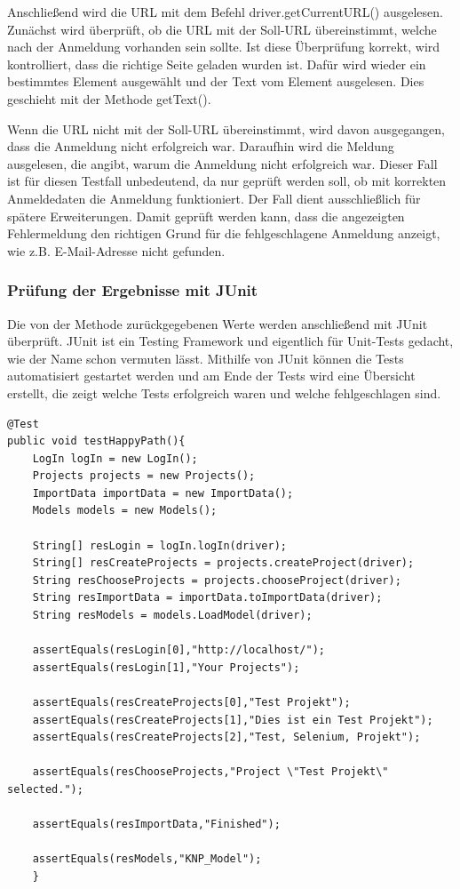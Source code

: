 \documentclass{llncs}
\begin{document}
Anschließend wird die URL mit dem Befehl driver.getCurrentURL() ausgelesen. Zunächst wird überprüft, ob die URL mit der Soll-URL übereinstimmt, welche nach der Anmeldung vorhanden sein sollte. Ist diese Überprüfung korrekt, wird kontrolliert, dass die richtige Seite geladen wurden ist. Dafür wird wieder ein bestimmtes Element ausgewählt und der Text vom Element ausgelesen. Dies geschieht mit der Methode getText(). 

Wenn die URL nicht mit der Soll-URL übereinstimmt, wird davon ausgegangen, dass die Anmeldung nicht erfolgreich war. Daraufhin wird die Meldung ausgelesen, die angibt, warum die Anmeldung nicht erfolgreich war. Dieser Fall ist für diesen Testfall unbedeutend, da nur geprüft werden soll, ob mit korrekten Anmeldedaten die Anmeldung funktioniert. Der Fall dient ausschließlich für spätere Erweiterungen. Damit geprüft werden kann, dass die angezeigten Fehlermeldung den richtigen Grund für die fehlgeschlagene Anmeldung anzeigt, wie z.B. E-Mail-Adresse nicht gefunden.

\subsubsection{Prüfung der Ergebnisse mit JUnit}
Die von der Methode zurückgegebenen Werte werden anschließend mit JUnit überprüft. JUnit ist ein Testing Framework und eigentlich für Unit-Tests gedacht, wie der Name schon vermuten lässt. Mithilfe von JUnit können die Tests automatisiert gestartet werden und am Ende der Tests wird eine Übersicht erstellt, die zeigt welche Tests erfolgreich waren und welche fehlgeschlagen sind.

\lstset{language = Java}
\begin{lstlisting}
@Test
public void testHappyPath(){
	LogIn logIn = new LogIn();
	Projects projects = new Projects();
	ImportData importData = new ImportData();
	Models models = new Models();
		
	String[] resLogin = logIn.logIn(driver);
	String[] resCreateProjects = projects.createProject(driver);
	String resChooseProjects = projects.chooseProject(driver);
	String resImportData = importData.toImportData(driver);
	String resModels = models.LoadModel(driver);
		
	assertEquals(resLogin[0],"http://localhost/");	
	assertEquals(resLogin[1],"Your Projects");	
		
	assertEquals(resCreateProjects[0],"Test Projekt");
	assertEquals(resCreateProjects[1],"Dies ist ein Test Projekt");	
	assertEquals(resCreateProjects[2],"Test, Selenium, Projekt");	
		
	assertEquals(resChooseProjects,"Project \"Test Projekt\" selected.");
		
	assertEquals(resImportData,"Finished");
		
	assertEquals(resModels,"KNP_Model");
	}
\end{lstlisting}
\end{document}
